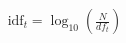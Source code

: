 \documentclass[preview]{standalone}
\begin{document}
\begin{align*}
\text{idf}_t = \log_{10} \left( \frac{N}{df_t} \right)
\end{align*}
\end{document}
